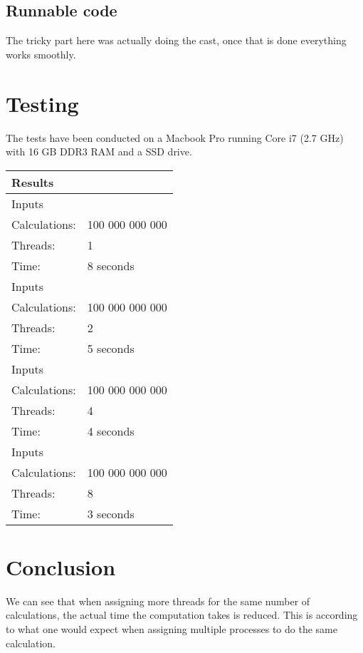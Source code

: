 

\subsection{Runnable code}
The tricky part here was actually doing the cast, once that is done everything works smoothly.\\



\section{Testing}
The tests have been conducted on a Macbook Pro running Core i7 (2.7 GHz) with 16 GB DDR3 RAM and a SSD drive.

\newcommand{\rowhead}[1] {
\multicolumn{2}{l}{#1}\\
\hline
}

\newcommand{\row}[3] {
\hline
\rowcolor{gr1}
Inputs&\\
\hline \hline
\rowcolor{gr2}
Calculations: & #1 \\
\hline
\rowcolor{gr2}
Threads: & #2 \\
\hline
\rowcolor{gr2}
Time: & #3 \\
\hline \hline
}

\newcommand{\botrow}[3] {
\hline
\rowcolor{gr1}
Inputs&\\
\hline \hline
\rowcolor{gr2}
N = & #1 \\
\hline
\rowcolor{gr2}
Threads: & #2 \\
\hline
\rowcolor{gr2}
Time: & #3 \\
\hline
}

\begin{table}[ht]
\begin{tabular}{| p{} | p{} |}
\rowhead{Results}
\row{100 000 000 000}{1}{8 seconds}
\row{100 000 000 000}{2}{5 seconds}
\row{100 000 000 000}{4}{4 seconds}
\row{100 000 000 000}{8}{3 seconds}
\end{tabular}
\end{table}

\section{Conclusion}
We can see that when assigning more threads for the same number of calculations, the actual time the computation takes is reduced.
This is according to what one would expect when assigning multiple processes to do the same calculation.\\

